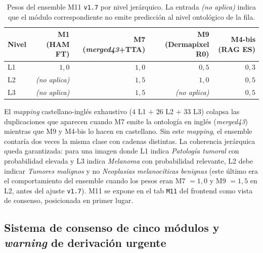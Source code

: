 \begin{table}[H]
\centering
\footnotesize
\setlength{\tabcolsep}{4pt}
\renewcommand{\arraystretch}{0.95}
\caption{Pesos del ensemble M11 \texttt{v1.7} por nivel jerárquico.
La entrada \emph{(no aplica)} indica que el módulo correspondiente
no emite predicción al nivel ontológico de la fila.}
\label{tab:m11-weights}
\begin{tabular}{lrrrr}
\hline
Nivel & M1 (HAM FT) & M7 (\emph{merged43}+TTA) & M9 (Dermapixel R0) & M4-bis (RAG ES) \\
\hline
L1   & $1{,}0$           & $1{,}0$           & $0{,}5$           & $0{,}3$           \\
L2   & \emph{(no aplica)}& $1{,}5$           & $1{,}0$           & $0{,}5$           \\
L3   & \emph{(no aplica)}& $1{,}5$           & \emph{(no aplica)}& $0{,}5$           \\
\hline
\end{tabular}
\end{table}

El \emph{mapping} castellano-inglés exhaustivo ($4$ L1
$+$ $26$ L2 $+$ $33$ L3) colapsa las duplicaciones que aparecen
cuando M7 emite la ontología en inglés (\emph{merged43}) mientras
que M9 y M4-bis lo hacen en castellano. Sin este \emph{mapping},
el ensemble contaría dos veces la misma clase con cadenas
distintas. La coherencia jerárquica queda garantizada: para una
imagen donde L1 indica \emph{Patología tumoral} con probabilidad
elevada y L3 indica \emph{Melanoma} con probabilidad relevante,
L2 debe indicar \emph{Tumores malignos} y no \emph{Neoplasias
melanocíticas benignas} (este último era el comportamiento del
ensemble cuando los pesos eran M7 $= 1{,}0$ y M9 $= 1{,}5$ en L2,
antes del ajuste \texttt{v1.7}). M11 se expone en el tab
\texttt{M11} del frontend como vista de consenso, posicionada en
primer lugar.

\subsection{Sistema de consenso de cinco módulos y \emph{warning}
de derivación urgente}
\label{sec:dermapixel-consenso}


